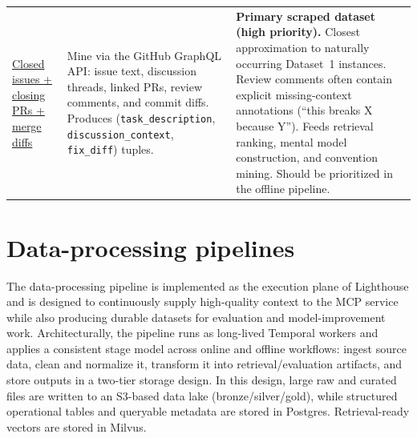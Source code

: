 \documentclass[a4paper,12pt]{article}
\begin{document}
\begin{longtable}{@{} p{3cm} p{5cm} p{7cm} @{}}
\href{https://docs.github.com/en/graphql}{Closed issues + closing PRs + merge diffs} &
Mine via the GitHub GraphQL API: issue text, discussion threads, linked PRs, review comments, and commit diffs. Produces (\texttt{task\_description}, \texttt{discussion\_context}, \texttt{fix\_diff}) tuples. &
\textbf{Primary scraped dataset (high priority).} Closest approximation to naturally occurring Dataset~1 instances. Review comments often contain explicit missing-context annotations (“this breaks X because Y”). Feeds retrieval ranking, mental model construction, and convention mining. Should be prioritized in the offline pipeline. \\

\end{longtable}

%
%
%
%
%

\section{Data-processing pipelines}



The data-processing pipeline is implemented as the execution plane of Lighthouse and is designed to continuously supply high-quality context to the MCP service while also producing durable datasets for evaluation and model-improvement work. Architecturally, the pipeline runs as long-lived Temporal workers and applies a consistent stage model across online and offline workflows: ingest source data, clean and normalize it, transform it into retrieval/evaluation artifacts, and store outputs in a two-tier storage design. In this design, large raw and curated files are written to an S3-based data lake (bronze/silver/gold), while structured operational tables and queryable metadata are stored in Postgres. Retrieval-ready vectors are stored in Milvus.
\end{document}
